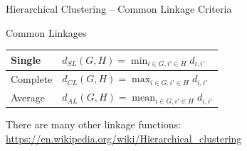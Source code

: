 \documentclass[ignorenonframetext,xcolor=x11names]{beamer}
\begin{document}
\begin{frame}{Hierarchical Clustering -- Common Linkage Criteria}
\begin{block}{Common Linkages}
\renewcommand{\arraystretch}{1.5}
\centering

\begin{tabular}{l|l} \hline
Single & $\displaystyle d_{SL}(G,H) = \min_{i \in G, i' \in H} d_{i, i'}$  \\ \hline
Complete & $\displaystyle d_{CL}(G,H) = \max_{i \in G, i' \in H} d_{i, i'}$  \\ \hline
Average & $\displaystyle d_{AL}(G,H) = \operatorname*{mean}_{i \in G, i' \in H} d_{i, i'}$  \\ \hline
\end{tabular}
\end{block}
\small
\vspace{\baselineskip}
There are many other linkage functions: \url{https://en.wikipedia.org/wiki/Hierarchical_clustering}
\end{frame}
\end{document}

